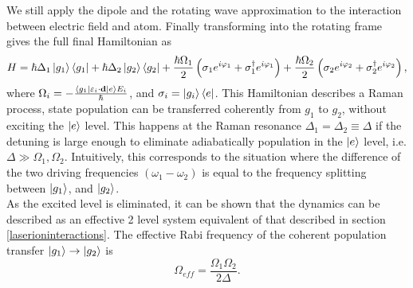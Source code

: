 We still apply the dipole and the rotating wave approximation to the interaction between electric field and atom. Finally transforming into the rotating frame gives the full final Hamiltonian as
\begin{equation}
H = \hbar \Delta_1 \ket{g_1}\bra{g_1} + \hbar\Delta_2 \ket{g_2}\bra{g_2}+ \frac{\hbar \Omega_1}{2}\left(\sigma_1 e^{i\varphi_1} +\sigma_1^\dagger e^{i\varphi_1}\right)+ \frac{\hbar \Omega_2}{2}\left(\sigma_2 e^{i\varphi_2} +\sigma_2^\dagger e^{i\varphi_2}\right),
\end{equation}
where $\Omega_i = -\frac{\braket{g_1|\varepsilon_i \cdot \mathbf{d}|e}E_{i}}{\hbar}$, and $\sigma_i = \ket{g_i}\bra{e}$. This Hamiltonian describes a Raman process, state population can be transferred coherently from $g_{1}$ to $g_{2}$, without exciting the $\ket{e}$ level. This happens at the Raman resonance $\Delta_1 = \Delta_2 \equiv \Delta$ if the detuning is large enough to eliminate adiabatically population in the $\ket{e}$ level, i.e. $\Delta \gg \Omega_1,\Omega_2$. Intuitively, this corresponds to the situation where the difference of the two driving frequencies $(\omega_1-\omega_2)$ is equal to the frequency splitting between $\ket{g_1}$, and $\ket{g_2}$.\\
As the excited level is eliminated, it can be shown \cite{russo} that the dynamics can be described as an effective 2 level system equivalent of that described in section \ref{laserioninteractions}. The effective Rabi frequency of the coherent population transfer $\ket{g_1} \to \ket{g_2}$ is \cite{steck}
\begin{equation}
\label{eq:effectiverabi}
\Omega_{eff} = \frac{\Omega_1\Omega_2}{2\Delta}.
\end{equation}

